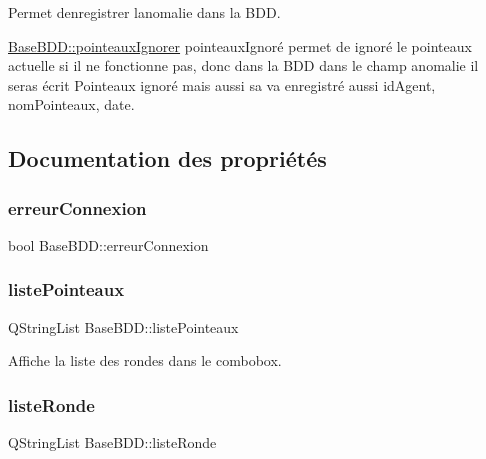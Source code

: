 Permet d\textquotesingle{}enregistrer l\textquotesingle{}anomalie dans la B\+DD. 

\hyperlink{class_base_b_d_d_acbdf1ddaaaff9fa469ecef3a14ef1081}{Base\+B\+D\+D\+::pointeaux\+Ignorer} pointeaux\+Ignoré permet de ignoré le pointeaux actuelle si il ne fonctionne pas, donc dans la B\+DD dans le champ anomalie il seras écrit Pointeaux ignoré mais aussi sa va enregistré aussi id\+Agent, nom\+Pointeaux, date. 

\subsection{Documentation des propriétés}
\mbox{\label{class_base_b_d_d_a11fdd43781eea1fe6f9b9b91d83a4a64}} 
\subsubsection{\texorpdfstring{erreur\+Connexion}{erreurConnexion}}
{\footnotesize\ttfamily bool Base\+B\+D\+D\+::erreur\+Connexion}

\mbox{\label{class_base_b_d_d_a706e89c393728daa3478dfe83208489c}} 
\subsubsection{\texorpdfstring{liste\+Pointeaux}{listePointeaux}}
{\footnotesize\ttfamily Q\+String\+List Base\+B\+D\+D\+::liste\+Pointeaux\hspace{0.3cm}{\ttfamily [read]}}



Affiche la liste des rondes dans le combobox. 

\mbox{\label{class_base_b_d_d_abb6ff92708dd4be7304be2b3e74930c4}} 
\subsubsection{\texorpdfstring{liste\+Ronde}{listeRonde}}
{\footnotesize\ttfamily Q\+String\+List Base\+B\+D\+D\+::liste\+Ronde\hspace{0.3cm}{\ttfamily [read]}}



